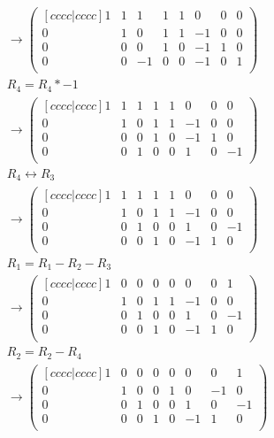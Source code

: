 \documentclass[12pt,a4paper,final,onecolumn,oneside]{article}
\begin{document}
\begin{enumerate}[label=(\alph*)]
\begin{equation*}
\begin{aligned}
    &\xrightarrow[]{}
    \begin{pmatrix}[cccc|cccc]
        1 & 1 & 1 & 1    &   1 & 0 & 0 & 0 \\
        0 & 1 & 0 & 1    &   1 & -1 & 0 & 0 \\
        0 & 0 & 0 & 1    &   0 & -1 & 1 & 0 \\
        0 & 0 & -1 & 0   &   0 & -1 & 0 & 1 \\
    \end{pmatrix} \\
    &R_4 = R_4 * -1 \\
    &\xrightarrow[]{}
    \begin{pmatrix}[cccc|cccc]
        1 & 1 & 1 & 1    &   1 & 0 & 0 & 0 \\
        0 & 1 & 0 & 1    &   1 & -1 & 0 & 0 \\
        0 & 0 & 0 & 1    &   0 & -1 & 1 & 0 \\
        0 & 0 & 1 & 0    &   0 & 1 & 0 & -1 \\
    \end{pmatrix} \\
    &R_4 \longleftrightarrow R_3 \\
    &\xrightarrow[]{}
    \begin{pmatrix}[cccc|cccc]
        1 & 1 & 1 & 1    &   1 & 0 & 0 & 0 \\
        0 & 1 & 0 & 1    &   1 & -1 & 0 & 0 \\
        0 & 0 & 1 & 0    &   0 & 1 & 0 & -1 \\
        0 & 0 & 0 & 1    &   0 & -1 & 1 & 0 \\
    \end{pmatrix} \\
    &R_1 = R_1 - R_2 - R_3  \\
    &\xrightarrow[]{}
    \begin{pmatrix}[cccc|cccc]
        1 & 0 & 0 & 0    &   0 & 0 & 0 & 1 \\
        0 & 1 & 0 & 1    &   1 & -1 & 0 & 0 \\
        0 & 0 & 1 & 0    &   0 & 1 & 0 & -1 \\
        0 & 0 & 0 & 1    &   0 & -1 & 1 & 0 \\
    \end{pmatrix} \\
    &R_2 = R_2 - R_4  \\
    &\xrightarrow[]{}
    \begin{pmatrix}[cccc|cccc]
        1 & 0 & 0 & 0    &   0 & 0 & 0 & 1 \\
        0 & 1 & 0 & 0    &   1 & 0 & -1 & 0 \\
        0 & 0 & 1 & 0    &   0 & 1 & 0 & -1 \\
        0 & 0 & 0 & 1    &   0 & -1 & 1 & 0 \\
    \end{pmatrix} \\
    \end{aligned}
    \end{equation*}
    

\end{enumerate}
\end{document}
